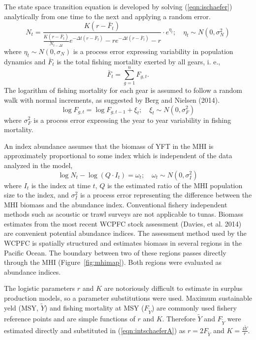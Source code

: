 \documentclass[12pt,letterpaper]{article}
\newcommand\MSY{\widetilde{Y}}
\newcommand\Fmsy{F_{\MSY}}
\begin{document}
The state space transition equation is developed by solving
(\ref{eqn:ischaefer}) analytically from one time to the next and
applying a random error.
\begin{equation}
\label{eqn:intschaeferA}
N_t = \frac{K(r-\bar{F}_t)}{\frac{K(r-\bar{F}_t)}{N_{t-\Delta t}}e^{-\Delta
t(r-\bar{F}_t)}-re^{-\Delta t(r-\bar{F}_t)} -r} \cdot e^{\eta_t};
\quad \eta_t\sim N(0,\sigma^2_N)
\end{equation}
where $\eta_t \sim N(0,\sigma_N)$ is a process error expressing
variability in population dynamics
and $\bar{F}_t$ is the total fishing mortality exerted by all gears, i. e.,
$$
\bar{F}_t =\sum_{g=1}^n F_{g,t}.
$$
The logarithm of fishing mortality for each gear is assumed to
follow a random walk with normal increments, as suggested by Berg and
Nielsen (2014).
\begin{equation}
\label{eqn:Fwalk}
\log F_{g,t} = \log F_{g,t-1} + \xi_t;\quad \xi_t\sim
N(0,\sigma^2_F)
\end{equation}
where  $\sigma^2_F$ is a process error expressing the year to year
variability in fishing mortality.

An index abundance assumes that the biomass of YFT in the MHI
is approximately proportional to some index which is independent of
the data analyzed in the model,
\begin{equation}
\log N_t - \log (Q\cdot I_t) = \omega_t;\quad \omega_t\sim N(0,\sigma^2_I)
\label{eqn:index}
\end{equation}
where
$I_t$ is the index at time $t$,
$Q$ is the estimated ratio of the MHI population size to the index,
and $\sigma^2_I$ is a process error representing the difference
between the MHI biomass and the abundance index. 
Conventional fishery independent methods such as acoustic or trawl
surveys are not applicable to tunas. 
Biomass estimates from the most recent WCPFC stock
assessment (Davies, et al. 2014) are convenient potential abundance
indices. The assessment method used by the
WCPFC is spatially structured and estimates biomass in several regions
in the Pacific Ocean. The boundary between two of these
regions passes directly through the MHI (Figure~\ref{fig:mhimap}).
Both regions were evaluated as abundance indices.

The logistic parameters $r$ and $K$ are notoriously difficult to estimate
in surplus production models, 
so a parameter substitutions were used. 
Maximum sustainable yeld
(MSY, $\MSY$) and fishing mortality at MSY ($\Fmsy$) are commonly used
fishery reference points and are simple functions of $r$ and $K$.
Therefore $\MSY$ and $\Fmsy$ were
estimated directly and substituted in (\ref{eqn:intschaeferA}) as
$r=2\Fmsy$ and $K=\frac{4\MSY}{r}$.
\end{document}
